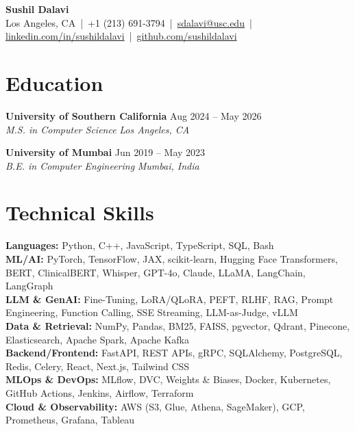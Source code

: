 \documentclass[letterpaper,10pt]{article}
\newcommand{\resumeSubheading}[4]{%
  \vspace{2pt}%
  \textbf{#1} \hfill {#2} \\[-1pt]
  \textit{#3} \hfill \textit{#4}%
  \vspace{1pt}%
}
\begin{document}
\begin{center}
  {\LARGE\textbf{Sushil Dalavi}}\\[4pt]
  Los Angeles, CA \,|\, +1 (213) 691-3794 \,|\,
  \href{mailto:sdalavi@usc.edu}{sdalavi@usc.edu} \,|\,
  \href{https://linkedin.com/in/sushildalavi}{linkedin.com/in/sushildalavi} \,|\,
  \href{https://github.com/sushildalavi}{github.com/sushildalavi}
\end{center}

\section{Education}

\resumeSubheading
  {University of Southern California}{Aug 2024 -- May 2026}
  {M.S. in Computer Science}{Los Angeles, CA}

\vspace{4pt}

\resumeSubheading
  {University of Mumbai}{Jun 2019 -- May 2023}
  {B.E. in Computer Engineering}{Mumbai, India}

\section{Technical Skills}

\textbf{Languages:} Python, C++, JavaScript, TypeScript, SQL, Bash \\
\textbf{ML/AI:} PyTorch, TensorFlow, JAX, scikit-learn, Hugging Face Transformers, BERT, ClinicalBERT, Whisper, GPT-4o, Claude, LLaMA, LangChain, LangGraph \\
\textbf{LLM \& GenAI:} Fine-Tuning, LoRA/QLoRA, PEFT, RLHF, RAG, Prompt Engineering, Function Calling, SSE Streaming, LLM-as-Judge, vLLM \\
\textbf{Data \& Retrieval:} NumPy, Pandas, BM25, FAISS, pgvector, Qdrant, Pinecone, Elasticsearch, Apache Spark, Apache Kafka \\
\textbf{Backend/Frontend:} FastAPI, REST APIs, gRPC, SQLAlchemy, PostgreSQL, Redis, Celery, React, Next.js, Tailwind CSS \\
\textbf{MLOps \& DevOps:} MLflow, DVC, Weights \& Biases, Docker, Kubernetes, GitHub Actions, Jenkins, Airflow, Terraform \\
\textbf{Cloud \& Observability:} AWS (S3, Glue, Athena, SageMaker), GCP, Prometheus, Grafana, Tableau
\end{document}
